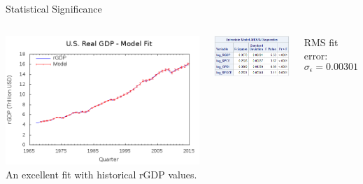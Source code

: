 \begin{frame}{Statistical Significance}
    \begin{columns}[c]
        \includegraphics[width=\textwidth]{../img/model1-rgdp-fit.png}
        An excellent fit with historical rGDP values.
        
        \vspace{.9cm}
        \includegraphics[width=\textwidth]{../img/model1-fitstats.png}
        
        \vspace{.9cm}
        RMS fit error: \[\sigma_\epsilon = 0.00301 \]
    \end{columns}
\end{frame}

